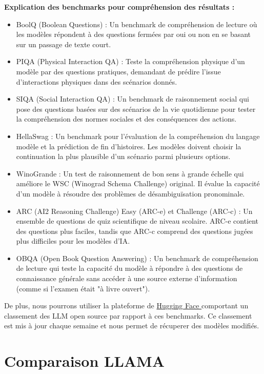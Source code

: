 \documentclass[11pt]{rapport_class}
\begin{document}
\textbf{Explication des benchmarks pour compréhension des résultats :}
\begin{itemize}
\item BoolQ (Boolean Questions) : Un benchmark de compréhension de lecture où les modèles répondent à des questions fermées par oui ou non en se basant sur un passage de texte court.
\item PIQA (Physical Interaction QA) : Teste la compréhension physique d'un modèle par des questions pratiques, demandant de prédire l'issue d'interactions physiques dans des scénarios donnés.
\item SIQA (Social Interaction QA) : Un benchmark de raisonnement social qui pose des questions basées sur des scénarios de la vie quotidienne pour tester la compréhension des normes sociales et des conséquences des actions.
\item HellaSwag : Un benchmark pour l'évaluation de la compréhension du langage modèle et la prédiction de fin d'histoires. Les modèles doivent choisir la continuation la plus plausible d'un scénario parmi plusieurs options.
\item WinoGrande : Un test de raisonnement de bon sens à grande échelle qui améliore le WSC (Winograd Schema Challenge) original. Il évalue la capacité d'un modèle à résoudre des problèmes de désambiguïsation pronominale.
\item ARC (AI2 Reasoning Challenge) Easy (ARC-e) et Challenge (ARC-c) : Un ensemble de questions de quiz scientifique de niveau scolaire. ARC-e contient des questions plus faciles, tandis que ARC-c comprend des questions jugées plus difficiles pour les modèles d'IA.
\item OBQA (Open Book Question Answering) : Un benchmark de compréhension de lecture qui teste la capacité du modèle à répondre à des questions de connaissance générale sans accéder à une source externe d'information (comme si l'examen était "à livre ouvert").
\end{itemize}

De plus, nous pourrons utiliser la plateforme de \href{https://huggingface.co/spaces/HuggingFaceH4/open_llm_leaderboard}{ Hugging Face } comportant un classement des LLM open source par rapport à ces benchmarks. Ce classement est mis à jour chaque semaine et nous permet de récuperer des modèles modifiés.



\newpage

\section{Comparaison LLAMA}
\end{document}
